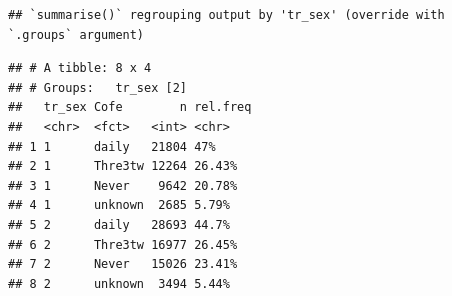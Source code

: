 \documentclass[
]{article}
\newenvironment{Shaded}{\begin{snugshade}}{\end{snugshade}}
\newcommand{\DataTypeTok}[1]{\textcolor[rgb]{0.13,0.29,0.53}{#1}}
\newcommand{\DecValTok}[1]{\textcolor[rgb]{0.00,0.00,0.81}{#1}}
\newcommand{\KeywordTok}[1]{\textcolor[rgb]{0.13,0.29,0.53}{\textbf{#1}}}
\newcommand{\NormalTok}[1]{#1}
\newcommand{\OperatorTok}[1]{\textcolor[rgb]{0.81,0.36,0.00}{\textbf{#1}}}
\newcommand{\OtherTok}[1]{\textcolor[rgb]{0.56,0.35,0.01}{#1}}
\newcommand{\StringTok}[1]{\textcolor[rgb]{0.31,0.60,0.02}{#1}}
\begin{document}
\begin{Shaded}
\end{Shaded}

\begin{verbatim}
## `summarise()` regrouping output by 'tr_sex' (override with `.groups` argument)
\end{verbatim}

\begin{verbatim}
## # A tibble: 8 x 4
## # Groups:   tr_sex [2]
##   tr_sex Cofe        n rel.freq
##   <chr>  <fct>   <int> <chr>   
## 1 1      daily   21804 47%     
## 2 1      Thre3tw 12264 26.43%  
## 3 1      Never    9642 20.78%  
## 4 1      unknown  2685 5.79%   
## 5 2      daily   28693 44.7%   
## 6 2      Thre3tw 16977 26.45%  
## 7 2      Never   15026 23.41%  
## 8 2      unknown  3494 5.44%
\end{verbatim}

\begin{Shaded}
\end{Shaded}
\end{document}
